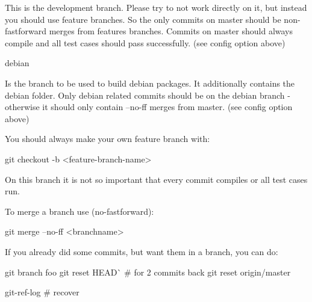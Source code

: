 This is the development branch. Please try to not work directly on it, but instead you should use feature branches. So the only commits on master should be non-\/fastforward merges from features branches. Commits on master should always compile and all test cases should pass successfully. (see config option above) \begin{DoxyVerb}debian
\end{DoxyVerb}


Is the branch to be used to build debian packages. It additionally contains the debian folder. Only debian related commits should be on the debian branch -\/ otherwise it should only contain --no-\/ff merges from master. (see config option above)

You should always make your own feature branch with\+:


\begin{DoxyCode}
git checkout -b <feature-branch-name>
\end{DoxyCode}


On this branch it is not so important that every commit compiles or all test cases run.

To merge a branch use (no-\/fastforward)\+:


\begin{DoxyCode}
git merge --no-ff <branchname>
\end{DoxyCode}


If you already did some commits, but want them in a branch, you can do\+:


\begin{DoxyCode}
git branch foo
git reset HEAD^^  # for 2 commits back
git reset origin/master

git-ref-log # recover
\end{DoxyCode}
 